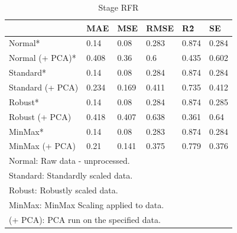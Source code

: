 \documentclass[conference]{IEEEtran}
\begin{document}
\begin{table}[H]
    \centering
    \caption{Stage RFR}
    \begin{adjustbox}{width=\columnwidth,center}
    \begin{tabular}{llllll}
        ~ & MAE & MSE & RMSE & R\^2 & SE \\ \hline
        Normal* & 0.14 & 0.08 & 0.283 & 0.874 & 0.284 \\ 
        Normal (+ PCA)* & 0.408 & 0.36 & 0.6 & 0.435 & 0.602 \\ 
        Standard* & 0.14 & 0.08 & 0.284 & 0.874 & 0.284 \\ 
        Standard (+ PCA) & 0.234 & 0.169 & 0.411 & 0.735 & 0.412 \\ 
        Robust* & 0.14 & 0.08 & 0.284 & 0.874 & 0.285 \\ 
        Robust (+ PCA) & 0.418 & 0.407 & 0.638 & 0.361 & 0.64 \\ 
        MinMax* & 0.14 & 0.08 & 0.283 & 0.874 & 0.284 \\ 
        MinMax (+ PCA) & 0.21 & 0.141 & 0.375 & 0.779 & 0.376 \\
        \bottomrule
        \multicolumn{6}{l}{\footnotesize *Normal: Raw data - unprocessed.}\\
        \multicolumn{6}{l}{\footnotesize *Standard: Standardly scaled data.}\\
        \multicolumn{6}{l}{\footnotesize *Robust: Robustly scaled data.}\\
        \multicolumn{6}{l}{\footnotesize *MinMax: MinMax Scaling applied to data.}\\
        \multicolumn{6}{l}{\footnotesize *(+ PCA): PCA run on the specified data.}\\
    \end{tabular}
    \end{adjustbox}
\end{table}
\end{document}
